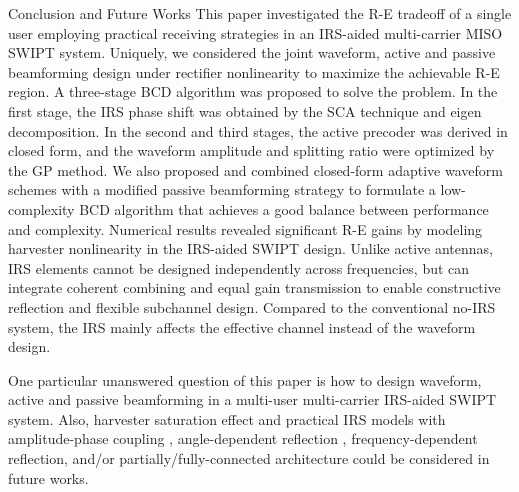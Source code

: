 \documentclass[journal]{IEEEtran}
\begin{document}
	\begin{section}{Conclusion and Future Works}\label{se:conclusion_and_future_works}
		This paper investigated the R-E tradeoff of a single user employing practical receiving strategies in an IRS-aided multi-carrier MISO SWIPT system. Uniquely, we considered the joint waveform, active and passive beamforming design under rectifier nonlinearity to maximize the achievable R-E region. A three-stage BCD algorithm was proposed to solve the problem. In the first stage, the IRS phase shift was obtained by the SCA technique and eigen decomposition. In the second and third stages, the active precoder was derived in closed form, and the waveform amplitude and splitting ratio were optimized by the GP method. We also proposed and combined closed-form adaptive waveform schemes with a modified passive beamforming strategy to formulate a low-complexity BCD algorithm that achieves a good balance between performance and complexity. Numerical results revealed significant R-E gains by modeling harvester nonlinearity in the IRS-aided SWIPT design. Unlike active antennas, IRS elements cannot be designed independently across frequencies, but can integrate coherent combining and equal gain transmission to enable constructive reflection and flexible subchannel design. Compared to the conventional no-IRS system, the IRS mainly affects the effective channel instead of the waveform design.

        One particular unanswered question of this paper is how to design waveform, active and passive beamforming in a multi-user multi-carrier IRS-aided SWIPT system. Also, harvester saturation effect and practical IRS models with amplitude-phase coupling \cite{Abeywickrama2020}, angle-dependent reflection \cite{Tang2021}, frequency-dependent reflection, and/or partially/fully-connected architecture \cite{Shen2020a} could be considered in future works.
	\end{section}
\end{document}
